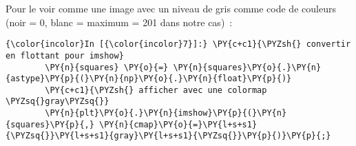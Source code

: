     Pour le voir comme une image avec un niveau de gris comme code de
couleurs (noir = 0, blanc = maximum = 201 dans notre cas)~:

    \begin{Verbatim}[commandchars=\\\{\}]
{\color{incolor}In [{\color{incolor}7}]:} \PY{c+c1}{\PYZsh{} convertir en flottant pour imshow}
        \PY{n}{squares} \PY{o}{=} \PY{n}{squares}\PY{o}{.}\PY{n}{astype}\PY{p}{(}\PY{n}{np}\PY{o}{.}\PY{n}{float}\PY{p}{)}
        \PY{c+c1}{\PYZsh{} afficher avec une colormap \PYZsq{}gray\PYZsq{}}
        \PY{n}{plt}\PY{o}{.}\PY{n}{imshow}\PY{p}{(}\PY{n}{squares}\PY{p}{,} \PY{n}{cmap}\PY{o}{=}\PY{l+s+s1}{\PYZsq{}}\PY{l+s+s1}{gray}\PY{l+s+s1}{\PYZsq{}}\PY{p}{)}\PY{p}{;}
\end{Verbatim}


    \begin{center}
    \end{center}
    { \hspace*{\fill} \\}
    

    
    
    
